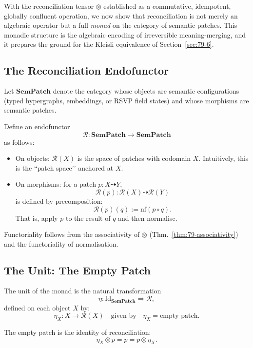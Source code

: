 With the reconciliation tensor $\otimes$ established as a commutative,
idempotent, globally confluent operation, we now show that reconciliation
is not merely an algebraic operator but a full \emph{monad} on the category
of semantic patches.  
This monadic structure is the algebraic encoding of irreversible
meaning-merging, and it prepares the ground for the Kleisli equivalence
of Section~\ref{sec:79-6}.

\subsection{The Reconciliation Endofunctor}
\label{subsec:79-5-endofunctor}

Let $\mathbf{SemPatch}$ denote the category whose objects are semantic
configurations (typed hypergraphs, embeddings, or RSVP field states)
and whose morphisms are semantic patches.

Define an endofunctor
\[
\mathcal{R} : \mathbf{SemPatch} \longrightarrow \mathbf{SemPatch}
\]
as follows:

\begin{itemize}
\item On objects:  
  $\mathcal{R}(X)$ is the space of patches with codomain $X$.  
  Intuitively, this is the ``patch space’’ anchored at $X$.

\item On morphisms:  
  for a patch $p : X \dasharrow Y$,  
  \[
  \mathcal{R}(p) : \mathcal{R}(X) \dasharrow \mathcal{R}(Y)
  \]
  is defined by precomposition:
  \[
  \mathcal{R}(p)(q) := \mathrm{nf}(p \circ q).
  \]
  That is, apply $p$ to the result of $q$ and then normalise.
\end{itemize}

Functoriality follows from the associativity of $\otimes$
(Thm.~\ref{thm:79-associativity}) and the functoriality of normalisation.

\subsection{The Unit: The Empty Patch}
\label{subsec:79-5-unit}

The unit of the monad is the natural transformation
\[
\eta : \mathrm{Id}_{\mathbf{SemPatch}} \Rightarrow \mathcal{R},
\]
defined on each object $X$ by:
\[
\eta_X : X \longrightarrow \mathcal{R}(X)
\quad\text{given by}\quad
\eta_X = \text{empty patch}.
\]

The empty patch is the identity of reconciliation:
\[
\eta_X \otimes p = p = p \otimes \eta_X.
\]

